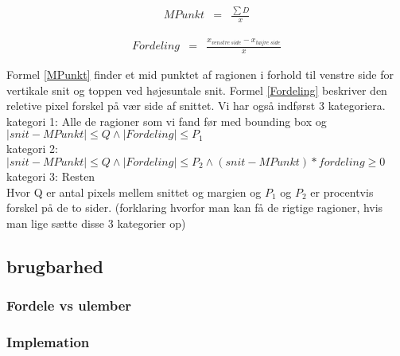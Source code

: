 \begin{eqnarray} 
 MPunkt &=& \frac {\sum{D}}{x}\label{MPunkt}
\end{eqnarray}

\begin{eqnarray} 
 Fordeling &=& \frac{x_{venstre~side}-x_{højre~side}}{x}\label{Fordeling}
\end{eqnarray}

Formel \ref{MPunkt} finder et mid punktet af ragionen i forhold til venstre side for vertikale snit og toppen ved højesuntale snit. Formel \ref{Fordeling} beskriver den reletive pixel forskel på vær side af snittet. Vi har også indførst 3 kategoriera.
kategori 1: Alle de ragioner som vi fand før med bounding box og $ |snit - MPunkt| \leq Q \wedge |Fordeling| \leq P_1$ \\
kategori 2: $|snit - MPunkt| \leq Q \wedge |Fordeling| \leq P_2 \wedge (snit - MPunkt)*fordeling \geq 0$ \\
kategori 3: Resten\\

Hvor Q er antal pixels mellem snittet og margien og $P_1$ og $P_2$ er procentvis forskel på de to sider.
(forklaring hvorfor man kan få de rigtige ragioner, hvis man lige sætte disse 3 kategorier op)
\subsection{brugbarhed}
\subsubsection{Fordele vs ulember}

\subsubsection{Implemation}
